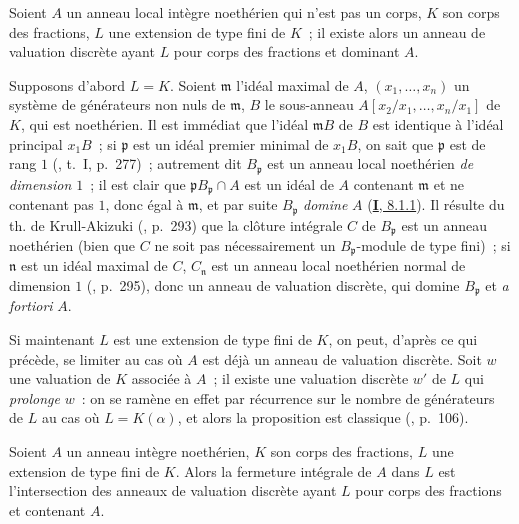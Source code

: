 \begin{proposition}[7.1.7]
\label{II.7.1.7-fr}
Soient $A$ un anneau local intègre noethérien qui n'est pas un corps, $K$ son
corps des fractions, $L$ une extension de type fini de $K$~; il existe alors
un anneau de valuation discrète ayant $L$ pour corps des fractions et
dominant $A$.
\end{proposition}

Supposons d'abord $L=K$. Soient $\mathfrak{m}$ l'idéal maximal de $A$,
$(x_1,\ldots,x_n)$ un système de générateurs non nuls de $\mathfrak{m}$,
$B$ le sous-anneau
$A[x_2/x_1,\ldots,x_n/x_1]$ de $K$, qui est noethérien. Il est immédiat que
l'idéal $\mathfrak{m}B$ de $B$ est identique à l'idéal principal $x_1B$~;
si $\mathfrak{p}$ est un idéal premier minimal de $x_1B$, on sait que
$\mathfrak{p}$ est de rang $1$ (\cite{I-13}, t.~I, p.~277)~; autrement dit
$B_{\mathfrak{p}}$ est un anneau local noethérien \emph{de dimension $1$}~;
il est clair que
$\mathfrak{p}B_{\mathfrak{p}}\cap A$ est un idéal de $A$ contenant
$\mathfrak{m}$ et ne contenant pas $1$, donc égal à $\mathfrak{m}$, et par
suite $B_{\mathfrak{p}}$ \emph{domine} $A$
(\hyperref[I.8.1.1-fr]{\textbf{I}, 8.1.1}). Il résulte du th. de Krull-Akizuki
(\cite{II-25}, p.~293) que la clôture intégrale $C$ de $B_{\mathfrak{p}}$
est un anneau noethérien (bien que $C$ ne soit pas nécessairement un
$B_{\mathfrak{p}}$-module de type fini)~; si $\mathfrak{n}$ est un idéal
maximal de $C$, $C_{\mathfrak{n}}$ est un anneau local noethérien normal de
dimension $1$ (\cite{II-25}, p.~295), donc un anneau de valuation discrète,
qui domine $B_{\mathfrak{p}}$ et \emph{a fortiori} $A$.

Si maintenant $L$ est une extension de type fini de $K$, on peut, d'après ce
qui précède, se limiter au cas où $A$ est déjà un anneau de valuation
discrète. Soit $w$ une valuation de $K$ associée à $A$~; il existe une
valuation discrète $w'$ de $L$ qui \emph{prolonge} $w$~: on se ramène en
effet par récurrence sur le nombre de générateurs de $L$ au cas où
$L=K(\alpha)$, et alors la proposition est classique
(\cite{II-24}, p.~106).

\begin{corollary}[7.1.8]
\label{II.7.1.8-fr}
Soient $A$ un anneau intègre noethérien, $K$ son corps des fractions, $L$ une
extension de type fini de $K$. Alors la fermeture intégrale de $A$ dans $L$
est l'intersection des anneaux de valuation discrète ayant $L$ pour corps des
fractions et contenant $A$.
\end{corollary}

